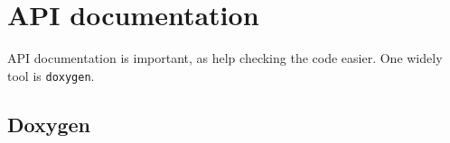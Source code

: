 \chapter{API documentation}

API documentation is important, as help checking the code easier. One widely
tool is \verb!doxygen!.

\section{Doxygen}

	
